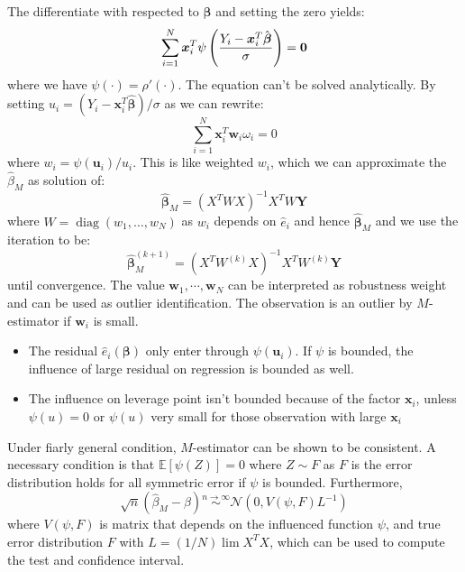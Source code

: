 \begin{remark}
    The differentiate with respected to $\boldsymbol \beta$ and setting the zero yields: 
    \begin{equation*}
        \sum^N_{i=1}\boldsymbol x_i^T\psi\left( \frac{Y_i - \boldsymbol x_i^T\hat{\boldsymbol \beta}}{\sigma} \right) = \boldsymbol 0
    \end{equation*}
    where we have $\psi(\cdot) = \rho'(\cdot)$. The equation can't be solved analytically. By setting $u_i = (Y_i - \boldsymbol x_i^T\hat{\boldsymbol \beta})/\sigma$ as we can rewrite:
    \begin{equation*}
        \sum^N_{i=1}\boldsymbol x_i^T\boldsymbol w_i\omega_i = 0
    \end{equation*}
    where $w_i = \psi(\boldsymbol u_i)/u_i$. This is like weighted $w_i$, which we can approximate the $\hat{\beta}_M$ as solution of:
    \begin{equation*}
        \hat{\boldsymbol \beta}_M = (X^TWX)^{-1}X^TW\boldsymbol Y
    \end{equation*}
    where $W = \operatorname{diag}(w_1,\dots,w_N)$ as $w_i$ depends on $\hat{e}_i$ and hence $\hat{\boldsymbol \beta}_M$ and we use the iteration to be:
    \begin{equation*}
        \hat{\boldsymbol \beta}^{(k+1)}_M = (X^TW^{(k)}X)^{-1}X^TW^{(k)}\boldsymbol Y
    \end{equation*}
    until convergence. The value $\boldsymbol w_1, \cdots, \boldsymbol w_N$ can be interpreted as robustness weight and can be used as outlier identification. The observation is an outlier by $M$-estimator if $\boldsymbol w_i$ is small. 
    \begin{itemize}
        \item The residual $\hat{e}_i(\boldsymbol \beta)$ only enter through $\psi(\boldsymbol u_i)$. If $\psi$ is bounded, the influence of large residual on regression is bounded as well. 
        \item The influence on leverage point isn't bounded because of the factor $\boldsymbol x_i$, unless $\psi(u) = 0$ or $\psi(u)$ very small for those observation with large $\boldsymbol x_i$
    \end{itemize}
\end{remark}

\begin{remark}
    Under fiarly general condition, $M$-estimator can be shown to be consistent. A necessary condition is that $\mathbb{E}[\psi(Z)] = 0$ where $Z\sim F$ as $F$ is the error distribution holds for all symmetric error if $\psi$ is bounded. Furthermore,
    \begin{equation*}
        \sqrt{n}(\hat{\beta}_M - \beta) \overset{n\rightarrow\infty}{\sim} \mathcal{N}(0, V(\psi, F)L^{-1})
    \end{equation*}
    where $V(\psi, F)$ is matrix that depends on the influenced function $\psi$, and true error distribution $F$ with $L = (1/N)\lim X^TX $, which can be used to compute the test and confidence interval. 
\end{remark}

